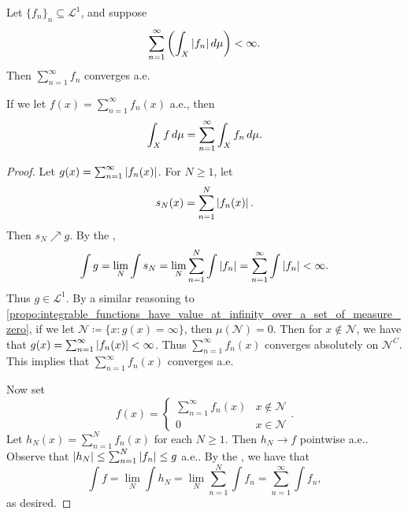 \documentclass[notoc,notitlepage]{tufte-book}
\begin{document}
\begin{crly}\label{crly:a_series_convergence_test_for_integrable_functions}
  Let $\{ f_n \}_n \subseteq \mathcal{L}^1$, and suppose
  \begin{equation*}
    \sum_{n=1}^{\infty} \left( \int_X \left|f_n\right| \mathop{}\!d{\mu} \right) < \infty.
  \end{equation*}
  Then $\sum_{n=1}^{\infty} f_n$ converges a.e.

  If we let $f(x) = \sum_{n=1}^{\infty} f_n(x)$ a.e., then
  \begin{equation*}
    \int_X f \mathop{}\!d{\mu} = \sum_{n=1}^{\infty} \int_X f_n \mathop{}\!d{\mu}.
  \end{equation*}
\end{crly}

\begin{proof}
  Let $g(x) = \sum_{n=1}^{\infty} \left|f_n(x)\right|$.
  For $N \geq 1$, let
  \begin{equation*}
    s_N(x) = \sum_{n=1}^{N} \left|f_n(x)\right|.
  \end{equation*}
  Then $s_N \nearrow g$.
  By the ,
  \begin{equation*}
    \int g = \lim_N \int s_N = \lim_N \sum_{n=1}^{N} \int \left|f_n\right|
    = \sum_{n=1}^{\infty} \int \left|f_n\right| < \infty.
  \end{equation*}
  Thus $g \in \mathcal{L}^1$.
  By a similar reasoning to
  \cref{propo:integrable_functions_have_value_at_infinity_over_a_set_of_measure_zero},
  if we let $\mathcal{N} \coloneqq \{ x : g(x) = \infty \}$, then
  $\mu(\mathcal{N}) = 0$.
  Then for $x \notin \mathcal{N}$, we have that $g(x) = \sum_{n=1}^{\infty}
  \left|f_n(x)\right| < \infty$.
  Thus $\sum_{n=1}^{\infty} f_n(x)$ converges absolutely on $\mathcal{N}^C$.
  This implies that $\sum_{n=1}^{\infty} f_n(x)$ converges a.e.

  Now set
  \begin{equation*}
    f(x) = \begin{cases}
      \sum_{n=1}^{\infty} f_n(x) & x \notin \mathcal{N} \\
      0 & x \in \mathcal{N}
    \end{cases}.
  \end{equation*}
  Let $h_N(x) = \sum_{n=1}^{N} f_n(x)$ for each $N \geq 1$.
  Then $h_N \to f$ pointwise a.e..
  Observe that $\left|h_N\right| \leq \sum_{n=1}^{N} \left|f_n\right| \leq g$ a.e..
  By the ,
  we have that
  \begin{equation*}
    \int f = \lim_N \int h_N = \lim_N \sum_{n=1}^{N} \int f_n
        = \sum_{n=1}^{\infty} \int f_n,
  \end{equation*}
  as desired.
\end{proof}
\end{document}
